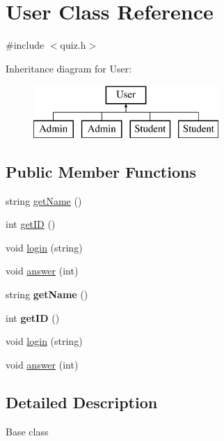 \hypertarget{class_user}{}\section{User Class Reference}
\label{class_user}


{\ttfamily \#include $<$quiz.\+h$>$}

Inheritance diagram for User\+:\begin{figure}[H]
\begin{center}
\leavevmode
\includegraphics[height=2.000000cm]{class_user}
\end{center}
\end{figure}
\subsection*{Public Member Functions}
\begin{DoxyCompactItemize}
\item 
string \hyperlink{class_user_adb316ac38d5f62a967686e7b736a0469}{get\+Name} ()
\item 
int \hyperlink{class_user_adce159ebd006321c4bfc869998064e7f}{get\+I\+D} ()
\item 
void \hyperlink{class_user_a7413d6e3ca3a5157beab559812a25a14}{login} (string)
\item 
void \hyperlink{class_user_a64a7433869a4ad67cf381a6d71b2f2d8}{answer} (int)
\item 
\hypertarget{class_user_adb316ac38d5f62a967686e7b736a0469}{}string {\bfseries get\+Name} ()\label{class_user_adb316ac38d5f62a967686e7b736a0469}

\item 
\hypertarget{class_user_adce159ebd006321c4bfc869998064e7f}{}int {\bfseries get\+I\+D} ()\label{class_user_adce159ebd006321c4bfc869998064e7f}

\item 
void \hyperlink{class_user_a7413d6e3ca3a5157beab559812a25a14}{login} (string)
\item 
void \hyperlink{class_user_a64a7433869a4ad67cf381a6d71b2f2d8}{answer} (int)
\end{DoxyCompactItemize}


\subsection{Detailed Description}
Base class 

